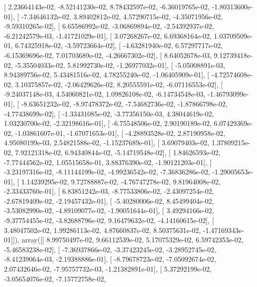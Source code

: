 \documentclass{article}
\begin{document}
       [  2.23664143e-02,  -8.52141230e-02,   8.78432597e-02,
         -6.36019765e-02,  -1.80313600e-01],
       [ -7.34646132e-02,   3.89402812e-02,   4.57290715e-02,
         -4.35071956e-02,  -9.59310265e-02],
       [  6.65586992e-02,  -3.06869894e-02,  -2.54392937e-02,
         -6.21242579e-03,  -1.41721029e-01],
       [  3.07268267e-02,   6.69368164e-02,   1.03709509e-01,
          6.74325918e-02,  -3.59723664e-02],
       [ -4.63281940e-02,   6.57297717e-02,  -6.15369696e-02,
          7.01703689e-02,  -4.26667302e-02],
       [  8.64052678e-03,   9.12739418e-02,  -5.35504033e-02,
          5.81992730e-02,  -1.26977032e-01],
       [ -5.05008891e-03,   8.94389756e-02,   5.43481516e-02,
          4.78255240e-02,  -1.06405909e-01],
       [ -4.72574608e-02,   3.10375857e-02,  -2.06429626e-02,
          8.20555591e-02,  -6.07116553e-02],
       [ -9.24037148e-03,   4.54060821e-02,   1.09826108e-02,
         -6.14734548e-03,  -1.46793099e-01],
       [ -8.63651232e-02,  -8.97478372e-02,  -7.54682736e-02,
         -1.87866798e-02,  -4.77438699e-02],
       [ -1.33431085e-02,  -3.77356150e-03,   4.38044619e-02,
          1.03230700e-02,  -2.32198616e-01],
       [ -6.75548506e-02,   2.90190189e-02,   6.07429369e-02,
         -1.03861607e-01,  -1.67071653e-01],
       [ -4.28893528e-02,   2.87190958e-02,   4.95080199e-03,
          2.54821588e-02,  -1.15237689e-01],
       [  3.69079403e-02,   1.37809215e-02,   7.92121318e-02,
          6.94340844e-02,  -5.14719548e-02],
       [  1.84626593e-02,  -7.77444562e-02,   1.05515658e-01,
          3.88376390e-02,  -1.90121203e-01],
       [ -3.23197316e-02,  -8.11144199e-02,  -4.99236542e-02,
         -7.36836286e-02,  -1.29005653e-01],
       [  1.14239295e-02,   9.72788887e-02,  -4.76747278e-02,
          9.81964008e-02,  -2.33433760e-01],
       [  6.83851242e-03,  -8.77533806e-02,  -2.43097254e-02,
         -2.67819409e-02,  -2.19457432e-01],
       [ -5.40280006e-02,   8.45499404e-02,  -3.53082990e-02,
         -4.89109077e-02,  -1.90051644e-01],
       [  3.49294166e-02,  -9.37754455e-02,  -3.82688796e-02,
          9.16479632e-02,  -4.14160615e-02],
       [  3.48047502e-02,   1.99286113e-02,   4.87660837e-02,
          8.50375631e-02,  -1.47169343e-01]]), array([[  8.99750497e-02,   9.66112539e-02,   5.17075329e-02,
          6.59742353e-02,  -5.46583238e-02],
       [ -7.36937866e-02,  -3.37423245e-02,  -3.28952745e-02,
         -8.41239064e-03,  -2.19388886e-01],
       [ -8.79678723e-02,  -7.05092674e-02,   2.07432646e-02,
         -7.95757732e-03,  -1.21382891e-01],
       [  5.37292199e-02,  -3.05654076e-02,  -7.15772758e-02,
\end{document}
